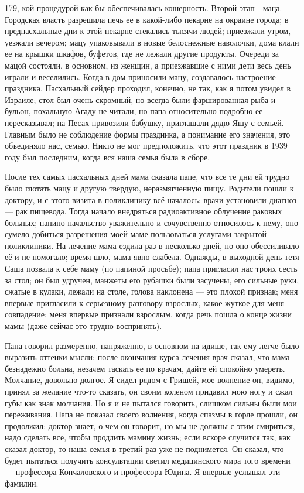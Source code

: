179, кой процедурой как бы обеспечивалась кошерность. Второй этап - маца. Городская власть разрешила печь ее в какой-либо пекарне на окраине города; в предпасхальные дни к этой пекарне стекались тысячи людей; приезжали утром, уезжали вечером; мацу упаковывали в новые белоснежные наволочки, дома клали ее на крышки шкафов, буфетов, где не лежали другие продукты. Очереди за мацой состояли, в основном, из женщин, а приезжавшие с ними дети весь день играли и веселились. Когда в дом приносили мацу, создавалось настроение праздника. Пасхальный сейдер проходил, конечно, не так, как я потом увидел в Израиле; стол был очень скромный, но всегда были фаршированная рыба и бульон, похальную Агаду не читали, но папа относительно подробно ее пересказывал; на Песах привозили бабушку, приглашали дядю Яшу с семьей. Главным было не соблюдение формы праздника, а понимание его значения, это объединяло нас, семью. Никто не мог предположить, что этот праздник в 1939 году был последним, когда вся наша семья была в сборе.

После тех самых пасхальных дней мама сказала папе, что все те дни ей трудно было глотать мацу и другую твердую, неразмягченную пищу. Родители пошли к доктору, и с этого визита в поликлинику всё началось: врачи установили диагноз — рак пищевода. Тогда начало внедряться радиоактивное облучение раковых больных; папино начальство уважительно и сочувственно относилось к нему, оно сумело добиться разрешения моей маме пользоваться услугами закрытой поликлиники. На лечение мама ездила раз в несколько дней, но оно обессиливало её и не помогало; время шло, мама явно слабела. Однажды, в выходной день тетя Саша позвала к себе маму (по папиной просьбе); папа пригласил нас троих сесть за стол; он был удручен, манжеты его рубашки были засучены, его сильные руки, сжатые в кулаки, лежали на столе, голова наклонена — это плохой признак; меня впервые пригласили к серьезному разговору взрослых, какое жуткое для меня совпадение: меня впервые признали взрослым, когда речь пошла о конце жизни мамы (даже сейчас это трудно воспринять).

Папа говорил размеренно, напряженно, в основном на идише, так ему легче было выразить оттенки мысли: после окончания курса лечения врач сказал, что мама безнадежно больна, незачем таскать ее по врачам, дайте ей спокойно умереть. Молчание, довольно долгое. Я сидел рядом с Гришей, мое волнение он, видимо, принял за желание что-то сказать, он своим коленом придавил мою ногу и сжал губы как знак молчания. Но я и не пытался говорить, слишком сильны были мои переживания. Папа не показал своего волнения, когда спазмы в горле прошли, он продолжил: доктор знает, о чем он говорит, но мы не должны с этим смириться, надо сделать все, чтобы продлить мамину жизнь; если вскоре случится так, как сказал доктор, то наша семья в третий раз уже не поднимется. Он сказал, что будет пытаться получить консультации светил медицинского мира того времени — профессора Кончаловского и профессора Юдина. Я впервые услышал эти фамилии.

